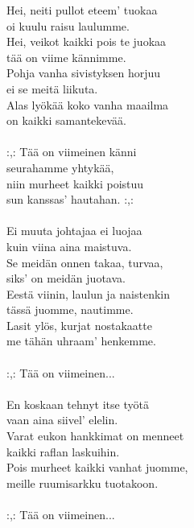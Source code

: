 
Hei, neiti pullot eteem' tuokaa \\ oi kuulu raisu laulumme. \\ Hei, veikot kaikki pois te juokaa \\ tää on viime kännimme. \\ Pohja vanha sivistyksen horjuu \\ ei se meitä liikuta. \\ Alas lyökää koko vanha maailma \\ on kaikki samantekevää. \\ \hspace{10mm} \\ :,: Tää on viimeinen känni \\ seurahamme yhtykää, \\ niin murheet kaikki poistuu \\ sun kanssas' hautahan. :,: \\ \hspace{10mm} \\ Ei muuta johtajaa ei luojaa \\ kuin viina aina maistuva. \\ Se meidän onnen takaa, turvaa, \\ siks' on meidän juotava. \\ Eestä viinin, laulun ja naistenkin \\ tässä juomme, nautimme. \\ Lasit ylös, kurjat nostakaatte \\ me tähän uhraam' henkemme. \\ \hspace{10mm} \\ :,: Tää on viimeinen... \\ \hspace{10mm} \\ En koskaan tehnyt itse työtä \\ vaan aina siivel' elelin. \\ Varat eukon hankkimat on menneet \\ kaikki raflan laskuihin. \\ Pois murheet kaikki vanhat juomme, \\ meille ruumisarkku tuotakoon. \\ \hspace{10mm} \\ :,: Tää on viimeinen...